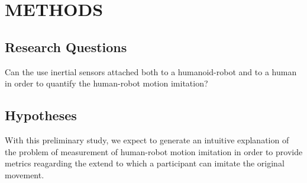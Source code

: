 \documentclass{sig-alternate-05-2015}
\begin{document}





% 
% 
% 







\section{METHODS}

\subsection{Research Questions}

Can the use inertial sensors attached  
both to a humanoid-robot and to a human in order to quantify the human-robot motion imitation?


\subsection{Hypotheses}
With this preliminary study, we expect to generate an intuitive 
explanation of the problem of measurement of human-robot motion imitation 
in order to provide metrics
reagarding the extend to which 
a participant can imitate the original movement.
\end{document}

